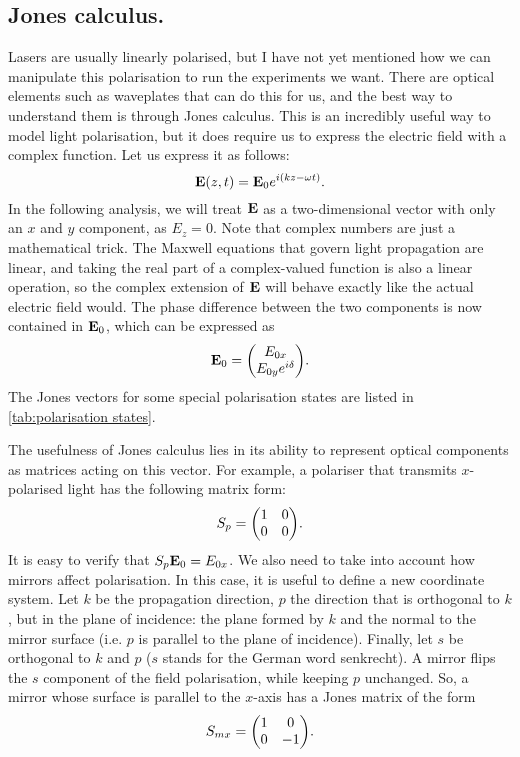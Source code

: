 \subsection{Jones calculus.} Lasers are usually linearly polarised, but I have not yet mentioned how we can manipulate this polarisation to run the experiments we want. There are optical elements such as waveplates that can do this for us, and the best way to understand them is through Jones calculus. This is an incredibly useful way to model light polarisation, but it does require us to express the electric field with a complex function. Let us express it as follows:
\begin{equation}
	\vb{E}(z, t) = \vb{E}_0 e^{i(kz-\omega t)}.
	\label{eq:propagator}
\end{equation}
In the following analysis, we will treat $ \vb{E} $ as a two-dimensional vector with only an $ x $ and $ y $ component, as $ E_z = 0 $. Note that complex numbers are just a mathematical trick. The Maxwell equations that govern light propagation are linear, and taking the real part of a complex-valued function is also a linear operation, so the complex extension of $ \vb{E} $ will behave exactly like the actual electric field would. The phase difference between the two components is now contained in $ \vb{E}_0 $, which can be expressed as
\begin{equation}
	\vb{E}_0 = \mqty(\Eox \\ \Eoy e^{i\delta} ).
\end{equation}
The Jones vectors for some special polarisation states are listed in \autoref{tab:polarisation states}.

The usefulness of Jones calculus lies in its ability to represent optical components as matrices acting on this vector. For example, a polariser that transmits $ x $-polarised light has the following matrix form:
\begin{equation}
	S_p = \mqty(1 & 0 \\ 0 & 0).
\end{equation}
It is easy to verify that $ S_p \vb{E}_0 = E_{0x} $. We also need to take into account how mirrors affect polarisation. In this case, it is useful to define a new coordinate system. Let $ k $ be the propagation direction, $ p $ the direction that is orthogonal to $ k $, but in the plane of incidence: the plane formed by $ k $ and the normal to the mirror surface (i.e. $ p $ is parallel to the plane of incidence). Finally, let $ s $ be orthogonal to $ k $ and $ p $ ($ s $ stands for the German word senkrecht). A mirror flips the $ s $ component of the field polarisation, while keeping $ p $ unchanged. So, a mirror whose surface is parallel to the $ x $-axis has a Jones matrix of the form
\begin{equation}
	S_{mx} = \mqty(1 & 0 \\ 0 & -1).
\end{equation}

